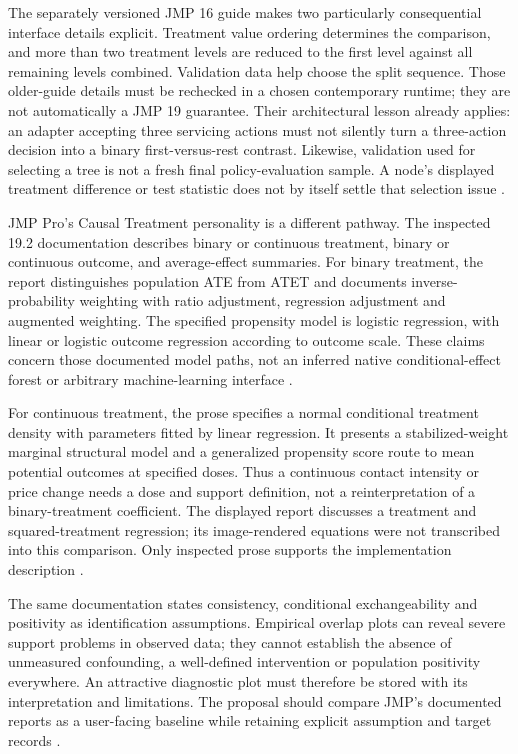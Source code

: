 The separately versioned JMP 16 guide makes two particularly consequential
interface details explicit. Treatment value ordering determines the
comparison, and more than two treatment levels are reduced to the first
level against all remaining levels combined. Validation data help choose
the split sequence. Those older-guide details must be rechecked in a
chosen contemporary runtime; they are not automatically a JMP 19 guarantee.
Their architectural lesson already applies: an adapter accepting three
servicing actions must not silently turn a three-action decision into a
binary first-versus-rest contrast. Likewise, validation used for selecting
a tree is not a fresh final policy-evaluation sample. A node's displayed
treatment difference or test statistic does not by itself settle that
selection issue \citep{exec13_ch_jmp_uplift}.

JMP Pro's Causal Treatment personality is a different pathway. The inspected
19.2 documentation describes binary or continuous treatment, binary or
continuous outcome, and average-effect summaries. For binary treatment,
the report distinguishes population ATE from ATET and documents
inverse-probability weighting with ratio adjustment, regression adjustment
and augmented weighting. The specified propensity model is logistic
regression, with linear or logistic outcome regression according to
outcome scale. These claims concern those documented model paths, not an
inferred native conditional-effect forest or arbitrary machine-learning
interface \citep{exec13_ch_jmp_causal}.

For continuous treatment, the prose specifies a normal conditional
treatment density with parameters fitted by linear regression. It presents
a stabilized-weight marginal structural model and a generalized propensity
score route to mean potential outcomes at specified doses. Thus a continuous
contact intensity or price change needs a dose and support definition,
not a reinterpretation of a binary-treatment coefficient. The displayed
report discusses a treatment and squared-treatment regression; its
image-rendered equations were not transcribed into this comparison.
Only inspected prose supports the implementation description
\citep{exec13_ch_jmp_causal}.

The same documentation states consistency, conditional exchangeability and
positivity as identification assumptions. Empirical overlap plots can
reveal severe support problems in observed data; they cannot establish the
absence of unmeasured confounding, a well-defined intervention or population
positivity everywhere. An attractive diagnostic plot must therefore be
stored with its interpretation and limitations. The proposal should
compare JMP's documented reports as a user-facing baseline while retaining
explicit assumption and target records \citep{exec13_ch_jmp_causal}.

